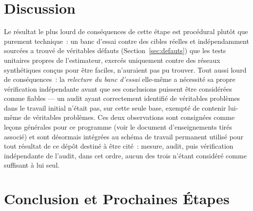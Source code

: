 \documentclass[11pt,a4paper]{article}
\begin{document}
\section{Discussion}

Le résultat le plus lourd de conséquences de cette étape est procédural
plutôt que purement technique~: un banc d'essai contre des cibles réelles
et indépendamment sourcées a trouvé de véritables défauts
(Section~\ref{sec:defauts}) que les tests unitaires propres de
l'estimateur, exercés uniquement contre des réseaux synthétiques conçus
pour être faciles, n'auraient pas pu trouver. Tout aussi lourd de
conséquences~: la \emph{relecture du banc d'essai} elle-même a nécessité
sa propre vérification indépendante avant que ses conclusions puissent
être considérées comme fiables --- un audit ayant correctement identifié
de véritables problèmes dans le travail initial n'était pas, sur cette
seule base, exempté de contenir lui-même de véritables problèmes. Ces
deux observations sont consignées comme leçons générales pour ce
programme (voir le document d'enseignements tirés associé) et sont
désormais intégrées au schéma de travail permanent utilisé pour tout
résultat de ce dépôt destiné à être cité~: mesure, audit, puis
vérification indépendante de l'audit, dans cet ordre, aucun des trois
n'étant considéré comme suffisant à lui seul.

\section{Conclusion et Prochaines Étapes}
\end{document}
